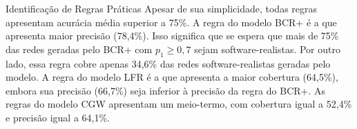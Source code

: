 \begin{section}{Identificação de Regras Práticas}
	Apesar de sua simplicidade, todas regras apresentam acurácia média superior a 75\%. A regra do modelo BCR+ é a que apresenta maior precisão (78,4\%). Isso significa que se espera que mais de 75\% das redes geradas pelo BCR+ com $p_1 \ge 0,7$ sejam software-realistas. Por outro lado, essa regra cobre apenas 34,6\% das redes software-realistas geradas pelo modelo. A regra do modelo LFR é a que apresenta a maior cobertura (64,5\%), embora sua precisão (66,7\%) seja inferior à precisão da regra do BCR+. As regras do modelo CGW apresentam um meio-termo, com cobertura igual a 52,4\% e precisão igual a 64,1\%.
	





\end{section}
